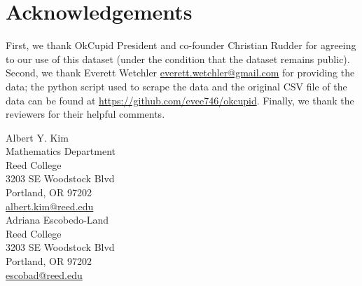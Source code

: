 \documentclass{article}\usepackage[]{graphicx}\usepackage[]{color}
\begin{document}
%
\section{Acknowledgements}\label{ack}
%
First, we thank OkCupid President and co-founder Christian Rudder for agreeing to our use of this dataset (under the condition that the dataset remains public).  Second, we thank Everett Wetchler \href{mailto:everett.wetchler@gmail.com}{everett.wetchler@gmail.com} for providing the data; the python script used to scrape the data and the original CSV file of the data can be found at \href{https://github.com/evee746/okcupid}{https://github.com/evee746/okcupid}.  Finally, we thank the reviewers for their helpful comments.  

\noindent\makebox[\linewidth]{\rule{\textwidth}{0.4pt}}

\noindent Albert Y. Kim\\
Mathematics Department\\
Reed College\\
3203 SE Woodstock Blvd\\
Portland, OR 97202\\
\href{mailto:albert.kim@reed.edu}{albert.kim@reed.edu}\\

\noindent Adriana Escobedo-Land\\
Reed College\\
3203 SE Woodstock Blvd\\
Portland, OR 97202\\
\href{mailto:escobad@reed.edu}{escobad@reed.edu}










%
%


\end{document}
